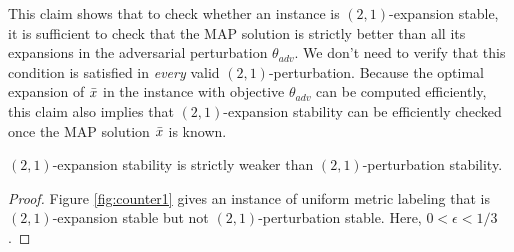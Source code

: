 This claim shows that to check whether an instance is $(2,1)$-expansion stable, it is sufficient to check that the MAP solution is strictly better than all its expansions in the adversarial perturbation $\theta_{adv}$. We don't need to verify that this condition is satisfied in \textit{every} valid $(2,1)$-perturbation. Because the optimal expansion of $\bar{x}$ in the instance with objective $\theta_{adv}$ can be computed efficiently, this claim also implies that $(2,1)$-expansion stability can be efficiently checked once the MAP solution $\bar{x}$ is known.

\begin{claim}\label{exp_weak}
$(2,1)$-expansion stability is strictly weaker than $(2,1)$-perturbation stability. 
\end{claim}
\begin{proof}
Figure \ref{fig:counter1} gives an instance of uniform metric labeling that is $(2,1)$-expansion stable but not $(2,1)$-perturbation stable. Here, $0 < \epsilon < 1/3$.
\end{proof}

